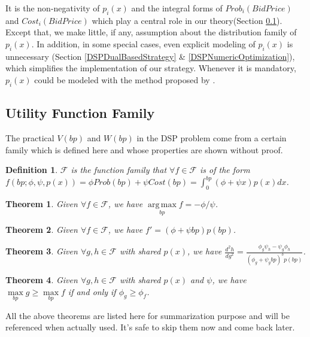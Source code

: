 \documentclass{article}
\DeclareMathOperator*{\argmax}{arg\,max}
\newtheorem{theorem}{Theorem}[section]
\newtheorem{definition}{Definition}[section]
\newcommand{\pprob}{\phi}
\newcommand{\pcost}{\psi}
\newcommand{\uff}{\mathscr{F}}
\newcommand{\uf}{f(bp; \pprob, \pcost, p(x))}
\begin{document}
It is the non-negativity of $p_i(x)$ and the integral forms of $Prob_i(BidPrice)$ and $Cost_i(BidPrice)$
    which play a central role in our theory(Section \ref{UtilityFunctionFamily}).
Except that, we make little, if any, assumption about the distribution family of $p_i(x)$.
In addition, in some special cases, even explicit modeling of $p_i(x)$ is unnecessary
    (Section \ref{DSPDualBasedStrategy} \& \ref{DSPNumericOptimization}), which simplifies the implementation of our strategy.
Whenever it is mandatory, $p_i(x)$ could be modeled with the method proposed by \cite{Wu2015}.

\subsection{Utility Function Family} \label{UtilityFunctionFamily}

The practical $V(bp)$ and $W(bp)$ in the DSP problem come from a certain family
    which is defined here and whose properties are shown without proof.

\begin{definition}
$\uff$ is the function family that $\forall f \in \uff$ is of the form
    $ \uf = \pprob Prob(bp) + \pcost Cost(bp) = \int_0^{bp} (\pprob + \pcost x)p(x)dx $.
\end{definition}

\begin{theorem} \label{ArgMaxTheorem}
Given $\forall f \in \uff$, we have $\argmax\limits_{bp} f = - \pprob / \pcost$.
\end{theorem}

\begin{theorem} \label{DerivationTheorem}
Given $\forall f \in \uff$, we have $f'=(\pprob + \pcost{}bp)p(bp)$.
\end{theorem}

\begin{theorem} \label{SecondDerivationTheorem}
Given $\forall g,h \in \uff$ with shared $p(x)$,
    we have $\frac{d^2h}{dg^2} = \frac{\pprob_g \pcost_h - \pcost_g \pprob_h}{(\pprob_g + \pcost_g bp)^3 p(bp)}$.
\end{theorem}

\begin{theorem} \label{ComparisonTheorem}
Given $\forall g,h \in \uff$ with shared $p(x)$ and $\pcost$, we have $\max\limits_{bp} g \ge \max\limits_{bp} f$
    if and only if $\pprob_g \ge \pprob_f$.
\end{theorem}

All the above theorems are listed here for summarization purpose and will be referenced when actually used.
It's safe to skip them now and come back later.
\end{document}
